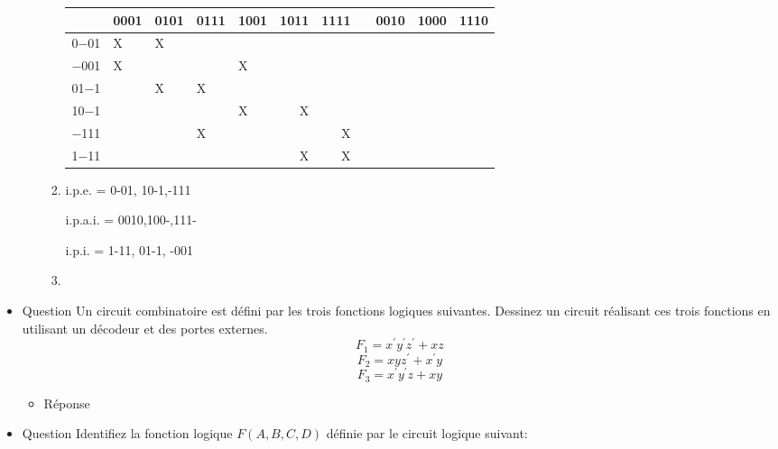 \documentclass[letter, oneside]{book}
\begin{document}
\begin{itemize}
\begin{itemize}
\begin{enumerate}
\begin{center}
\begin{tabular}{lllllrrlrrr}
 & 0001 & 0101 & 0111 & 1001 & 1011 & 1111 &  & 0010 & 1000 & 1110\\[0pt]
\hline
0−01 & X & X &  &  &  &  &  &  &  & \\[0pt]
−001 & X &  &  & X &  &  &  &  &  & \\[0pt]
01−1 &  & X & X &  &  &  &  &  &  & \\[0pt]
10−1 &  &  &  & X & X &  &  &  &  & \\[0pt]
−111 &  &  & X &  &  & X &  &  &  & \\[0pt]
1−11 &  &  &  &  & X & X &  &  &  & \\[0pt]
\end{tabular}
\end{center}

\item i.p.e.  = 0-01, 10-1,-111

i.p.a.i. = 0010,100-,111-

i.p.i. = 1-11, 01-1, -001

\item \begin{center}

\end{center}
\end{enumerate}
\end{itemize}

\item Question
\label{sec:org346c086}
Un circuit combinatoire est défini par les trois fonctions logiques
suivantes. Dessinez un circuit réalisant ces trois fonctions en
utilisant un décodeur et des portes externes.
$$
F_1  = x^{\prime} y^{\prime} z^{\prime} + xz 
$$
$$
F_2  = x y z^{\prime} + x^{\prime} y 
$$
$$
F_3  = x^{\prime} y^{\prime} z + x y
$$

\begin{itemize}
\item Réponse
\label{sec:org631ce3c}
\begin{center}

\end{center}
\end{itemize}

\item Question
\label{sec:org50a4a44}
Identifiez la fonction logique \(F(A,B,C,D)\) définie par le circuit
logique suivant:

\begin{center}

\end{center}


\end{itemize}
\end{document}
